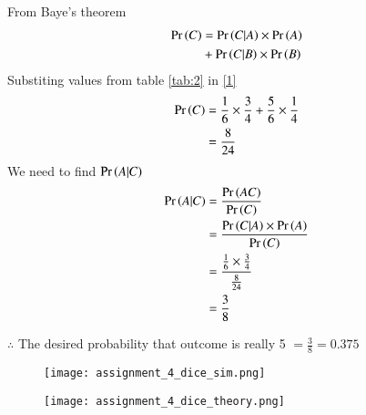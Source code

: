 \documentclass[journal,12pt,twocolumn]{IEEEtran}
\begin{document}
From Baye's theorem
\begin{align}
\Pr\left(C\right)&=\Pr\left(C|A\right) \times \Pr\left(A\right) \notag \\
 & +\Pr\left(C|B\right) \times \Pr\left(B\right)  \label{1}
\end{align}
Substiting values from table \eqref{tab:2} in \eqref{1}
\begin{align}
\Pr\left(C\right) &= \frac{1}{6} \times \frac{3}{4}  + \frac{5}{6} \times \frac{1}{4} \\
&=\frac{8}{24} \label{2}
\end{align}
We need to find $\Pr\left(A|C\right)$ 
\begin{align}
\Pr\left(A|C\right) &= \frac{\Pr\left(AC\right)}{\Pr\left(C\right)} \\
&=\frac{\Pr\left(C|A\right) \times \Pr\left(A\right)}{\Pr\left(C\right)}  \label{3} \\
&= \frac{\frac{1}{6} \times \frac{3}{4}}{\frac{8}{24}} \\
&=\frac{3}{8}
\end{align}

 $\therefore$ The desired probability that outcome is really 5 $= \frac{3}{8}=0.375$
\begin{figure}[htb!]
\begin{center}
\texttt{[image: assignment\_4\_dice\_sim.png]}
\end{center}
\end{figure}

\begin{figure}[htb!]
\begin{center}
\texttt{[image: assignment\_4\_dice\_theory.png]}
\end{center}
\end{figure}
\end{document}
